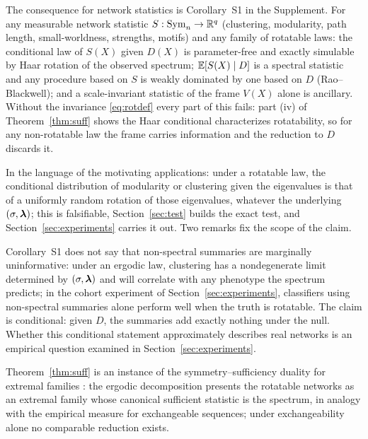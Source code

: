 The consequence for network statistics is Corollary~S1 in the
Supplement. For any measurable network statistic $S:\mathrm{Sym}_n\to\mathbb{R}^q$
(clustering, modularity, path length, small-worldness, strengths,
motifs) and any family of rotatable laws: the conditional law of
$S(X)$ given $D(X)$ is parameter-free and exactly simulable by Haar
rotation of the observed spectrum; $\mathbb{E}[S(X)\mid D]$ is a spectral
statistic and any procedure based on $S$ is weakly dominated by one
based on $D$ (Rao--Blackwell); and a scale-invariant statistic of the
frame $V(X)$ alone is ancillary. Without the invariance
\eqref{eq:rotdef} every part of this fails: part (iv) of
Theorem~\ref{thm:suff} shows the Haar conditional characterizes
rotatability, so for any non-rotatable law the frame carries
information and the reduction to $D$ discards it.

In the language of the motivating applications: under a rotatable
law, the conditional distribution of modularity or clustering given
the eigenvalues is that of a uniformly random rotation of those
eigenvalues, whatever the underlying $(\sigma,\bm{\lambda})$; this is
falsifiable, Section~\ref{sec:test} builds the exact test, and
Section~\ref{sec:experiments} carries it out. Two remarks fix the
scope of the claim.

\begin{remark}
\label{rem:scope}
Corollary~S1 does not say that non-spectral summaries are
marginally uninformative: under an ergodic law, clustering has a
nondegenerate limit determined by $(\sigma,\bm{\lambda})$ and will correlate with
any phenotype the spectrum predicts; in the cohort experiment of
Section~\ref{sec:experiments}, classifiers using non-spectral summaries
alone perform well when the truth is rotatable. The claim is conditional:
given $D$, the summaries add exactly nothing under the null. Whether this
conditional statement approximately describes real networks is an empirical
question examined in Section~\ref{sec:experiments}.
\end{remark}

\begin{remark}
Theorem~\ref{thm:suff} is an instance of the symmetry--sufficiency
duality for extremal families
\citep{lauritzen1988extremal,diaconis1984partial}: the ergodic
decomposition presents the rotatable networks as an extremal family
whose canonical sufficient statistic is the spectrum, in analogy with
the empirical measure for exchangeable sequences; under exchangeability
alone no comparable reduction exists.
\end{remark}
